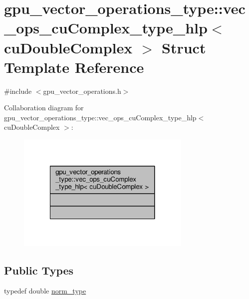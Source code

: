 \hypertarget{structgpu__vector__operations__type_1_1vec__ops__cuComplex__type__hlp_3_01cuDoubleComplex_01_4}{\section{gpu\-\_\-vector\-\_\-operations\-\_\-type\-:\-:vec\-\_\-ops\-\_\-cu\-Complex\-\_\-type\-\_\-hlp$<$ cu\-Double\-Complex $>$ Struct Template Reference}
\label{structgpu__vector__operations__type_1_1vec__ops__cuComplex__type__hlp_3_01cuDoubleComplex_01_4}
}


{\ttfamily \#include $<$gpu\-\_\-vector\-\_\-operations.\-h$>$}



Collaboration diagram for gpu\-\_\-vector\-\_\-operations\-\_\-type\-:\-:vec\-\_\-ops\-\_\-cu\-Complex\-\_\-type\-\_\-hlp$<$ cu\-Double\-Complex $>$\-:
\nopagebreak
\begin{figure}[H]
\begin{center}
\leavevmode
\includegraphics[width=236pt]{structgpu__vector__operations__type_1_1vec__ops__cuComplex__type__hlp_3_01cuDoubleComplex_01_4__coll__graph}
\end{center}
\end{figure}
\subsection*{Public Types}
\begin{DoxyCompactItemize}
\item 
typedef double \hyperlink{structgpu__vector__operations__type_1_1vec__ops__cuComplex__type__hlp_3_01cuDoubleComplex_01_4_a4d17e695719bc675d33dc12fced06c66}{norm\-\_\-type}
\end{DoxyCompactItemize}


